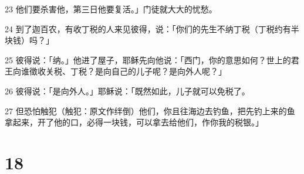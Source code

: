 \par 23 他们要杀害他，第三日他要复活。」门徒就大大的忧愁。
\par 24 到了迦百农，有收丁税的人来见彼得，说：「你们的先生不纳丁税（丁税约有半块钱）吗？」
\par 25 彼得说：「纳。」他进了屋子，耶稣先向他说：「西门，你的意思如何？世上的君王向谁徵收关税、丁税？是向自己的儿子呢？是向外人呢？」
\par 26 彼得说：「是向外人。」耶稣说：「既然如此，儿子就可以免税了。
\par 27 但恐怕触犯（触犯：原文作绊倒）他们，你且往海边去钓鱼，把先钓上来的鱼拿起来，开了他的口，必得一块钱，可以拿去给他们，作你我的税银。」

\chapter{18}

